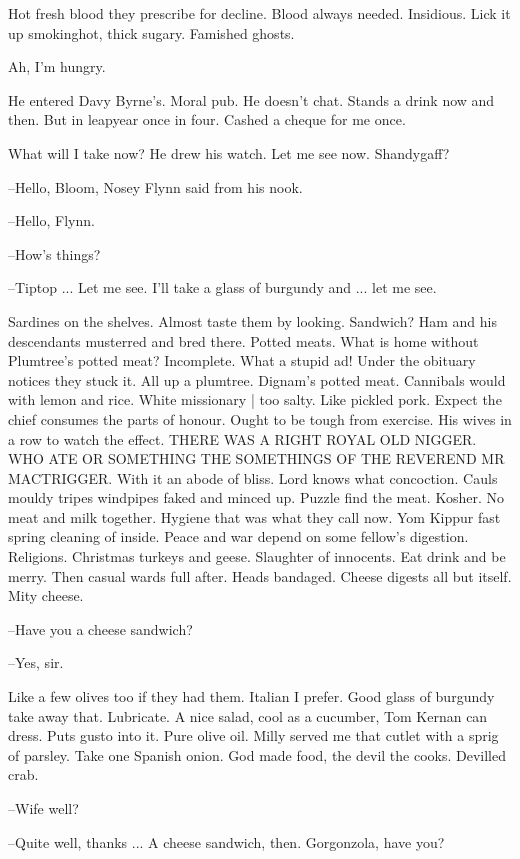 Hot fresh blood they prescribe for decline.
Blood always needed.
Insidious.
Lick it up smokinghot, thick sugary.
Famished ghosts.

Ah, I'm hungry.

He entered Davy Byrne's.
Moral pub.
He doesn't chat.
Stands a drink now and then.
But in leapyear once in four.
Cashed a cheque for me once.

What will I take now?
He drew his watch.
Let me see now.
Shandygaff?

--Hello,
Bloom,
Nosey Flynn said from his nook.

--Hello,
Flynn.

--How's things?

--Tiptop ...
Let me see.
I'll take a glass of burgundy and ...
let me see.

Sardines on the shelves.
Almost taste them by looking.
Sandwich?
Ham and his descendants musterred and bred there.
Potted meats.
What is home without Plumtree's potted meat?
Incomplete.
What a stupid ad!
Under the obituary notices they stuck it.
All up a plumtree.
Dignam's potted meat.
Cannibals would with lemon and rice.
White missionary |
too salty.
Like pickled pork.
Expect the chief consumes the parts of honour.
Ought to be tough from exercise.
His wives in a row to watch the effect.
THERE WAS A RIGHT ROYAL OLD NIGGER.
WHO ATE OR SOMETHING THE SOMETHINGS
OF THE REVEREND MR MACTRIGGER.
With it an abode of bliss.
Lord knows what concoction.
Cauls mouldy tripes windpipes faked and minced up.
Puzzle find the meat.
Kosher.
No meat and milk together.
Hygiene that was what they call now.
Yom Kippur fast spring cleaning of inside.
Peace and war depend on some fellow's digestion.
Religions.
Christmas turkeys and geese.
Slaughter of innocents.
Eat drink and be merry.
Then casual wards full after.
Heads bandaged.
Cheese digests all but itself.
Mity cheese.

--Have you a cheese sandwich?

--Yes,
sir.

Like a few olives too if they had them.
Italian I prefer.
Good glass of burgundy take away that.
Lubricate.
A nice salad,
cool as a cucumber,
Tom Kernan can dress.
Puts gusto into it.
Pure olive oil.
Milly served me that cutlet with a sprig of parsley.
Take one Spanish onion.
God made food,
the devil the cooks.
Devilled crab.

--Wife well?

--Quite well,
thanks ...
A cheese sandwich,
then.
Gorgonzola,
have you?

